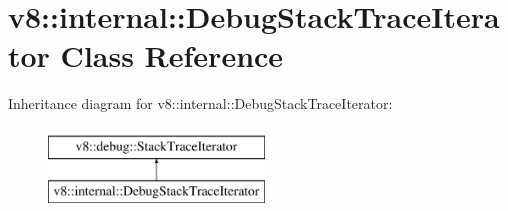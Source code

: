 \hypertarget{classv8_1_1internal_1_1DebugStackTraceIterator}{}\section{v8\+:\+:internal\+:\+:Debug\+Stack\+Trace\+Iterator Class Reference}
\label{classv8_1_1internal_1_1DebugStackTraceIterator}
Inheritance diagram for v8\+:\+:internal\+:\+:Debug\+Stack\+Trace\+Iterator\+:\begin{figure}[H]
\begin{center}
\leavevmode
\includegraphics[height=2.000000cm]{classv8_1_1internal_1_1DebugStackTraceIterator}
\end{center}
\end{figure}
